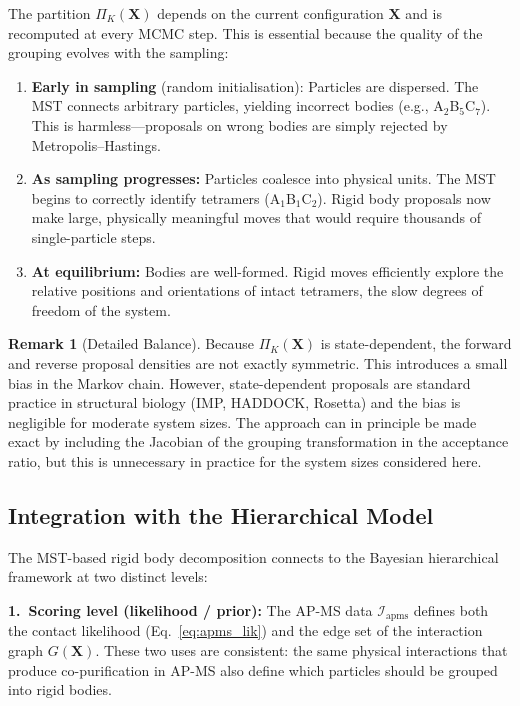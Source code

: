 \documentclass[11pt,a4paper]{article}
\newcommand{\bX}{\mathbf{X}}
\theoremstyle{definition}
\newtheorem{remark}{Remark}
\begin{document}
The partition $\Pi_K(\bX)$ depends on the current configuration $\bX$ and is recomputed at every MCMC step. This is essential because the quality of the grouping evolves with the sampling:

\begin{enumerate}
    \item \textbf{Early in sampling} (random initialisation): Particles are dispersed. The MST connects arbitrary particles, yielding incorrect bodies (e.g., A$_2$B$_5$C$_7$). This is harmless---proposals on wrong bodies are simply rejected by Metropolis--Hastings.
    
    \item \textbf{As sampling progresses:} Particles coalesce into physical units. The MST begins to correctly identify tetramers (A$_1$B$_1$C$_2$). Rigid body proposals now make large, physically meaningful moves that would require thousands of single-particle steps.
    
    \item \textbf{At equilibrium:} Bodies are well-formed. Rigid moves efficiently explore the relative positions and orientations of intact tetramers, the slow degrees of freedom of the system.
\end{enumerate}

\begin{remark}[Detailed Balance]
Because $\Pi_K(\bX)$ is state-dependent, the forward and reverse proposal densities are not exactly symmetric. This introduces a small bias in the Markov chain. However, state-dependent proposals are standard practice in structural biology (IMP, HADDOCK, Rosetta) and the bias is negligible for moderate system sizes. The approach can in principle be made exact by including the Jacobian of the grouping transformation in the acceptance ratio, but this is unnecessary in practice for the system sizes considered here.
\end{remark}

\subsection{Integration with the Hierarchical Model}

The MST-based rigid body decomposition connects to the Bayesian hierarchical framework at two distinct levels:

\textbf{1.\ Scoring level (likelihood / prior):}
The AP-MS data $\mathcal{I}_{\text{apms}}$ defines both the contact likelihood (Eq.~\ref{eq:apms_lik}) and the edge set of the interaction graph $G(\bX)$. These two uses are consistent: the same physical interactions that produce co-purification in AP-MS also define which particles should be grouped into rigid bodies.
\end{document}
